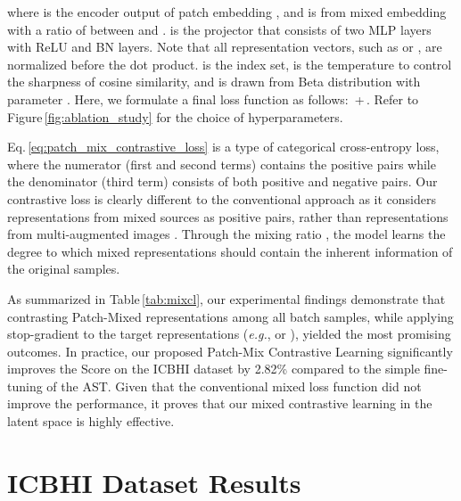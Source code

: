 \documentclass{INTERSPEECH2023}
\begin{document}
where  is the encoder output of patch embedding , and  is from mixed embedding with a ratio of  between  and .  is the projector that consists of two MLP layers with ReLU and BN layers. Note that all representation vectors, such as  or , are normalized before the dot product.  is the index set,  is the temperature to control the sharpness of cosine similarity, and  is drawn from Beta distribution with parameter . 
Here, we formulate a final loss function as follows: \,+\,.
Refer to Figure\,\ref{fig:ablation_study} for the choice of hyperparameters.


Eq.\,\ref{eq:patch_mix_contrastive_loss} is a type of categorical cross-entropy loss, where the numerator (first and second terms) contains the positive pairs while the denominator (third term) consists of both positive and negative pairs.
Our contrastive loss is clearly different to the conventional approach as it considers representations from mixed sources as positive pairs, rather than representations from multi-augmented images \cite{chen2020simple, he2020momentum}. 
Through the mixing ratio , the model learns the degree to which mixed representations should contain the inherent information of the original samples. 

As summarized in Table\,\ref{tab:mixcl}, our experimental findings demonstrate that contrasting Patch-Mixed representations among all batch samples, while applying stop-gradient to the target representations (\textit{e.g.},  or ), yielded the most promising outcomes. In practice, our proposed Patch-Mix Contrastive Learning significantly improves the Score on the ICBHI dataset by 2.82\% compared to the simple fine-tuning of the AST. 
Given that the conventional mixed loss function did not improve the performance, it proves that our mixed contrastive learning in the latent space is highly effective.

  

\vspace{-2pt}
\section{ICBHI Dataset Results}
\vspace{-1pt}
\end{document}
